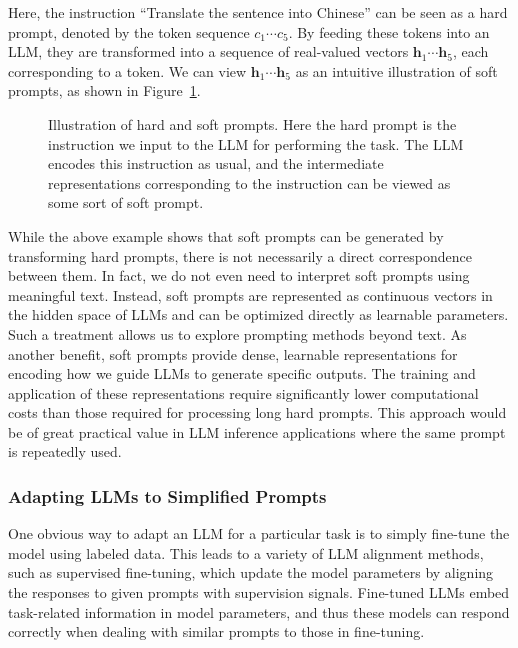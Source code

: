 \noindent Here, the instruction ``Translate the sentence into Chinese'' can be seen as a hard prompt, denoted by the token sequence $c_1 \cdots c_5$. By feeding these tokens into an LLM, they are transformed into a sequence of real-valued vectors $\mathbf{h}_1 \cdots \mathbf{h}_5$, each corresponding to a token. We can view $\mathbf{h}_1 \cdots \mathbf{h}_5$ as an intuitive illustration of soft prompts, as shown in Figure~\ref{fig:hard-and-soft-prompt-examples}.

\begin{figure}[!t]
\centering

\caption{Illustration of hard and soft prompts. Here  the hard prompt is the instruction we input to the LLM for performing the task. The LLM encodes this instruction as usual, and the intermediate representations corresponding to the instruction can be viewed as some sort of soft prompt.}
\label{fig:hard-and-soft-prompt-examples}
\end{figure}

While the above example shows that soft prompts can be generated by transforming hard prompts, there is not necessarily a direct correspondence between them. In fact, we do not even need to interpret soft prompts using meaningful text. Instead, soft prompts are represented as continuous vectors in the hidden space of LLMs and can be optimized directly as learnable parameters. Such a treatment allows us to explore prompting methods beyond text. As another benefit, soft prompts provide dense, learnable representations for encoding how we guide LLMs to generate specific outputs. The training and application of these representations require significantly lower computational costs than those required for processing long hard prompts. This approach would be of great practical value in LLM inference applications where the same prompt is repeatedly used.

\subsubsection{Adapting LLMs to Simplified Prompts}

\noindent One obvious way to adapt an LLM for a particular task is to simply fine-tune the model using labeled data. This leads to a variety of LLM alignment methods, such as supervised fine-tuning, which update the model parameters by aligning the responses to given prompts with supervision signals. Fine-tuned LLMs embed task-related information in model parameters, and thus these models can respond correctly when dealing with similar prompts to those in fine-tuning.

